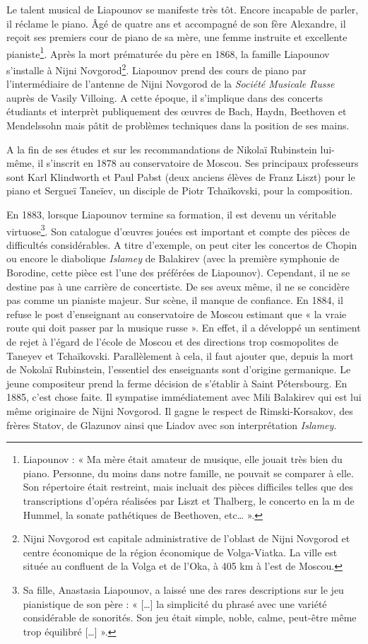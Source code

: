 Le talent musical de Liapounov se manifeste très tôt. Encore incapable de parler, il réclame le piano. Âgé de quatre ans et accompagné de son fère Alexandre, il reçoit ses premiers cour de piano de sa mère, une femme instruite et excellente pianiste\footnote{Liapounov : « Ma mère était amateur de musique, elle jouait très bien du piano. Personne, du moins dans notre famille, ne pouvait se comparer à elle. Son répertoire était restreint, mais incluait des pièces difficiles telles que des transcriptions d'opéra réalisées par Liszt et Thalberg, le concerto en la m de Hummel, la sonate pathétiques de Beethoven, etc\dots{} ».}. Après la mort prématurée du père en 1868, la famille Liapounov s'installe à Nijni Novgorod\footnote{Nijni Novgorod est capitale administrative de l'oblast de Nijni Novgorod et centre économique de la région économique de Volga-Viatka. La ville est située au confluent de la Volga et de l'Oka, à 405 km à l'est de Moscou.}. Liapounov prend des cours de piano par l'intermédiaire de l'antenne de Nijni Novgorod de la \emph{Société Musicale Russe} auprès de Vasily Villoing. A cette époque, il s'implique dans des concerts étudiants et interprèt publiquement des œuvres de Bach, Haydn, Beethoven et Mendelssohn mais pâtit de problèmes techniques dans la position de ses mains. 

A la fin de ses études et sur les recommandations de Nikolaï Rubinstein lui-même, il s'inscrit en 1878 au conservatoire de Moscou. Ses principaux professeurs sont Karl Klindworth et Paul Pabst (deux anciens élèves de Franz Liszt) pour le piano et Sergueï Taneïev, un disciple de Piotr Tchaïkovski, pour la composition.

En 1883, lorsque Liapounov termine sa formation, il est devenu un véritable virtuose\footnote{Sa fille, Anastasia Liapounov, a laissé une des rares descriptions sur le jeu pianistique de son père : « [\dots] la simplicité du phrasé avec une variété considérable de sonorités. Son jeu était simple, noble, calme, peut-être même trop équilibré [\dots] ».}. Son catalogue d'œuvres jouées est important et compte des pièces de difficultés considérables. A titre d'exemple, on peut citer les concertos de Chopin ou encore le diabolique \emph{Islamey} de Balakirev (avec la première symphonie de Borodine, cette pièce est l'une des préférées de Liapounov). Cependant, il ne se destine pas à une carrière de concertiste. De ses aveux même, il ne se concidère pas comme un pianiste majeur. Sur scène, il manque de confiance. En 1884, il refuse le post d'enseignant au conservatoire de Moscou estimant que « la vraie route qui doit passer par la musique russe ». En effet, il a développé un sentiment de rejet à l'égard de l'école de Moscou et des directions trop cosmopolites de Taneyev et Tchaïkovski. Parallèlement à cela, il faut ajouter que, depuis la mort de Nokolaï Rubinstein, l'essentiel des enseignants sont d'origine germanique. Le jeune compositeur prend la ferme décision de s'établir à Saint Pétersbourg. En 1885, c'est chose faite. Il sympatise immédiatement avec Mili Balakirev qui est lui même originaire de Nijni Novgorod. Il gagne le respect de Rimski-Korsakov, des frères Statov, de Glazunov ainsi que Liadov avec son interprétation \emph{Islamey}.

